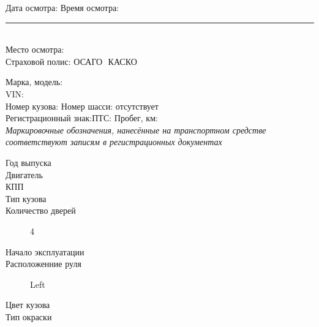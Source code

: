 \documentclass[a4paper,10pt]{report}
\begin{document}
\vspace{2mm}
\noindent Дата осмотра: \osm \hfill Время осмотра:\rule{30mm}{0.1mm}  \\
\noindent Место осмотра:\\
\noindent Страховой полис: ОСАГО {\large {}}\,\,КАСКО {\large {}}\,\,\, \polis\\
\vspace{-2mm}
\begin{tcolorbox}[title=\textsl{Сведения о транспортном средстве},leftrule=0pt,rightrule=0pt,toprule=0pt,titlerule=0pt,sharp corners,
	colback=white,colframe=white,coltitle=black,colbacktitle=YellowOrange]
\end{tcolorbox}
\vspace{-5mm}
\noindent Марка, модель: \\
\noindent VIN:{\vin} \\  
\noindent Номер кузова:{\vin} \hfill Номер шасси: отсутствует\\  
Регистрационный знак:\grz \hfill ПТС:  \hfill Пробег, км:\\
\textsl{\color{blue}Маркировочные обозначения, нанесённые на транспортном средстве  соответствуют  записям в регистрационных документах}\\
\noindent\parbox[l][5mm]{70mm}
{\begin{description}
			\item[Год выпуска] \hfill {}
			\item[Двигатель] \hfill {}
			\item[КПП] \hfill {}
			\item[Тип кузова] \hfill  {}
			\item[Количество дверей] \hfill 4 
		\end{description}
	}   %
\hfill
\parbox[l][5mm]{70mm}{  
		\begin{description}
			\item[Начало эксплуатации] \hfill {}
			\item[Расположенние руля] \hfill Left
			\item[Цвет кузова] \hfill  {}
			\item[Тип окраски] \hfill {}
					\end{description}
}\\
\vspace{15mm}
\end{document}
